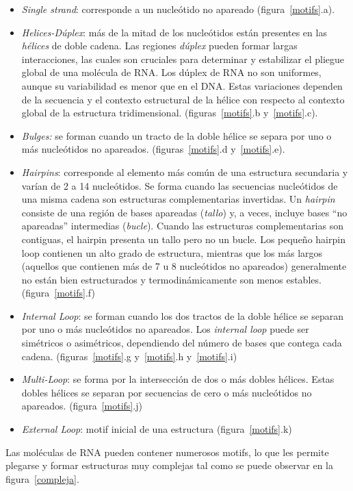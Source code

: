 \begin{itemize}

\item \emph{Single strand}: corresponde a un nucleótido no apareado (figura~\ref{motifs}.a).

\item \emph{Helices-Dúplex}: más de la mitad de los nucleótidos están presentes en las \emph{hélices} de doble cadena. Las regiones \emph{dúplex} pueden formar largas interacciones, las cuales son cruciales para determinar y estabilizar el pliegue global de una molécula de RNA. Los dúplex de RNA no son uniformes, aunque su variabilidad es menor que en el DNA. Estas variaciones dependen de la secuencia y el contexto estructural de la hélice con respecto al contexto global de la estructura tridimensional. (figuras~\ref{motifs}.b y~\ref{motifs}.c).

\item \emph{Bulges:} se forman cuando un tracto de la doble hélice se separa por uno o más nucleótidos no apareados. (figuras~\ref{motifs}.d y~\ref{motifs}.e).

\item \emph{Hairpins}: corresponde al elemento más común de una estructura secundaria y varían de 2 a 14 nucleótidos. Se forma cuando las secuencias nucleótidos de una misma cadena son estructuras complementarias invertidas.
Un \emph{hairpin} consiste de una región de bases apareadas (\emph{tallo}) y, a veces, incluye bases ``no apareadas'' intermedias (\emph{bucle}). Cuando las estructuras complementarias son contiguas, el hairpin presenta un tallo pero no un bucle. Los pequeño hairpin loop contienen un alto grado de estructura, mientras que los más largos (aquellos que contienen más de 7 u 8 nucleótidos no apareados) generalmente no están bien estructurados y termodinámicamente son menos estables. (figura~\ref{motifs}.f)
    
\item \emph{Internal Loop}: se forman cuando los dos tractos de la doble hélice se separan por uno o más nucleótidos no apareados. Los \emph{internal loop} puede ser simétricos o asimétricos, dependiendo del número de bases que contega cada cadena. (figuras~\ref{motifs}.g y~\ref{motifs}.h y~\ref{motifs}.i)

\item \emph{Multi-Loop}: se forma por la intersección de dos o más dobles hélices. Estas dobles hélices se separan por secuencias de cero o más nucleótidos no apareados. (figura~\ref{motifs}.j)

\item \emph{External Loop}: motif inicial de una estructura (figura~\ref{motifs}.k) 

\end{itemize}
\par Las moléculas de RNA pueden contener numerosos motifs, lo que les permite plegarse y formar estructuras muy complejas tal como se puede observar en la figura~\ref{compleja}.

